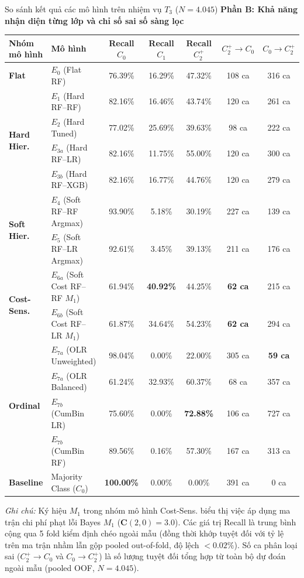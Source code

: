 \begin{table}{So sánh kết quả các mô hình trên nhiệm vụ $T_3$ ($N = 4.045$)}
\vspace{0.35cm}
\textbf{Phần B: Khả năng nhận diện từng lớp và chỉ số sai số sàng lọc}
\vspace{0.15cm}

\begin{tabularx}{\textwidth}{l X c c c c c}
\toprule
\textbf{Nhóm mô hình} & \textbf{Mô hình} & \textbf{Recall $C_0$} & \textbf{Recall $C_1$} & \textbf{Recall $C_2^+$} & \textbf{$C_2^+ \to C_0$} & \textbf{$C_0 \to C_2^+$} \\
\midrule
\textbf{Flat} & $E_0$ (Flat RF) & 76.39\% & 16.29\% & 47.32\% & 108 ca & 316 ca \\
\midrule
\multirow{4}{*}{\textbf{Hard Hier.}} 
  & $E_1$ (Hard RF--RF)   & 82.16\% & 16.46\% & 43.74\% & 120 ca & 261 ca \\
  & $E_2$ (Hard Tuned)    & 77.02\% & 25.69\% & 39.63\% & 98 ca & 222 ca \\
  & $E_{3a}$ (Hard RF--LR) & 82.16\% & 11.75\% & 55.00\% & 120 ca & 300 ca \\
  & $E_{3b}$ (Hard RF--XGB)& 82.16\% & 16.77\% & 44.76\% & 120 ca & 279 ca \\
\midrule
\multirow{2}{*}{\textbf{Soft Hier.}} 
  & $E_4$ (Soft RF--RF Argmax) & 93.90\% & 5.18\% & 30.19\% & 227 ca & 139 ca \\
  & $E_5$ (Soft RF--LR Argmax) & 92.61\% & 3.45\% & 39.13\% & 211 ca & 176 ca \\
\midrule
\multirow{2}{*}{\textbf{Cost-Sens.}}
  & $E_{6a}$ (Soft Cost RF--RF $M_1$) & 61.94\% & \textbf{40.92\%} & 44.25\% & \textbf{62 ca} & 215 ca \\
  & $E_{6b}$ (Soft Cost RF--LR $M_1$) & 61.87\% & 34.64\% & 54.23\% & \textbf{62 ca} & 294 ca \\
\midrule
\multirow{4}{*}{\textbf{Ordinal}} 
  & $E_{7a}$ (OLR Unweighted) & 98.04\% & 0.00\% & 22.00\% & 305 ca & \textbf{59 ca} \\
  & $E_{7a}$ (OLR Balanced)   & 61.24\% & 32.93\% & 60.37\% & 68 ca & 357 ca \\
  & $E_{7b}$ (CumBin LR)      & 75.60\% & 0.00\% & \textbf{72.88\%} & 106 ca & 727 ca \\
  & $E_{7b}$ (CumBin RF)      & 89.56\% & 0.16\% & 57.30\% & 167 ca & 313 ca \\
\midrule
\textbf{Baseline} & Majority Class ($C_0$) & \textbf{100.00\%} & 0.00\% & 0.00\% & 391 ca & 0 ca \\
\bottomrule
\end{tabularx}

\vspace{0.15cm}
\raggedright
\scriptsize
\textit{Ghi chú:} Ký hiệu $M_1$ trong nhóm mô hình Cost-Sens. biểu thị việc áp dụng ma trận chi phí phạt lỗi Bayes $M_1$ ($\mathbf{C}(2, 0) = 3.0$). Các giá trị Recall là trung bình cộng qua 5 fold kiểm định chéo ngoài mẫu (đồng thời khớp tuyệt đối với tỷ lệ trên ma trận nhầm lẫn gộp pooled out-of-fold, độ lệch $< 0.02\%$). Số ca phân loại sai ($C_2^+ \to C_0$ và $C_0 \to C_2^+$) là số lượng tuyệt đối tổng hợp từ toàn bộ dự đoán ngoài mẫu (pooled OOF, $N = 4.045$).
\end{table}
